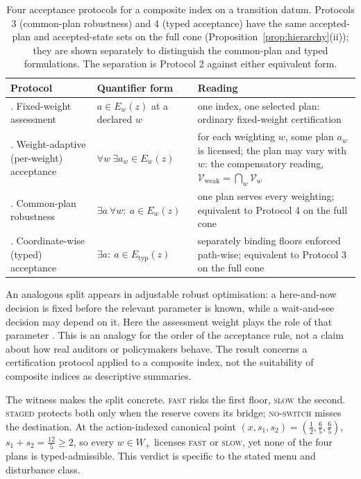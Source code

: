 \documentclass[preprint,11pt,authoryear]{elsarticle}
\theoremstyle{definition}
\theoremstyle{remark}
\newcommand{\Etyp}{E_{\mathrm{typ}}}
\newcommand{\Vweak}{\mathcal{V}_{\mathrm{weak}}}
\newcommand{\Wp}{W_+}
\newcommand{\act}[1]{\textsc{#1}}
\begin{document}
\begin{table}[!htbp]
\centering\small
\caption{Four acceptance protocols for a composite index on a transition datum. Protocols 3 (common-plan robustness) and 4 (typed acceptance) have the same accepted-plan and accepted-state sets on the full cone (Proposition~\ref{prop:hierarchy}(ii)); they are shown separately to distinguish the common-plan and typed formulations. The separation is Protocol 2 against either equivalent form.}
\label{tab:protocols}
\begin{tabularx}{\textwidth}{>{\raggedright\arraybackslash}p{} >{\raggedright\arraybackslash}p{} X}
\toprule
Protocol & Quantifier form & Reading \\
\midrule
1. Fixed-weight assessment & $a\in E_w(z)$ at a declared $w$ & one index, one selected plan: ordinary fixed-weight certification \\
2. Weight-adaptive (per-weight) acceptance & $\forall w\ \exists a_w\in E_w(z)$ & for each weighting $w$, some plan $a_w$ is licensed; the plan may vary with $w$: the compensatory reading, $\Vweak=\bigcap_w\mathcal V_w$ \\
3. Common-plan robustness & $\exists a\ \forall w:\ a\in E_w(z)$ & one plan serves every weighting; equivalent to Protocol 4 on the full cone \\
4. Coordinate-wise (typed) acceptance & $\exists a:\ a\in\Etyp(z)$ & separately binding floors enforced path-wise; equivalent to Protocol 3 on the full cone \\
\bottomrule
\end{tabularx}
\end{table}

An analogous split appears in adjustable robust optimisation: a here-and-now decision is fixed before the relevant parameter is known, while a wait-and-see decision may depend on it. Here the assessment weight plays the role of that parameter \citep{BenTal2004}. This is an analogy for the order of the acceptance rule, not a claim about how real auditors or policymakers behave. The result concerns a certification protocol applied to a composite index, not the suitability of composite indices as descriptive summaries.

The witness makes the split concrete. \act{fast} risks the first floor, \act{slow} the second. \act{staged} protects both only when the reserve covers its bridge; \act{no-switch} misses the destination. At the action-indexed canonical point $(x,s_1,s_2)=(\tfrac12,\tfrac65,\tfrac65)$, $s_1+s_2=\tfrac{12}5\ge2$, so every $w\in\Wp$ licenses \act{fast} or \act{slow}, yet none of the four plans is typed-admissible. This verdict is specific to the stated menu and disturbance class.
\end{document}

